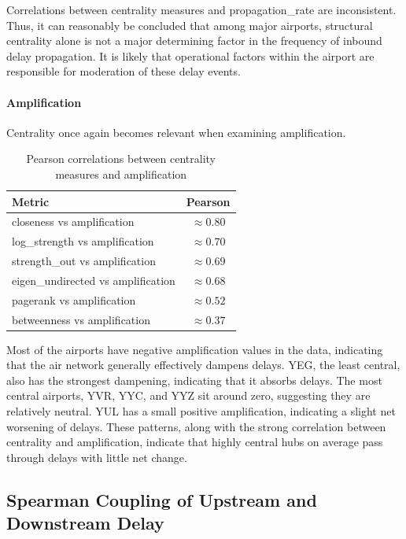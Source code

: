 \documentclass[10pt]{article}
\begin{document}
Correlations between centrality measures and propagation\_rate are inconsistent. Thus, it can reasonably be concluded that among major airports, structural centrality alone is not a major determining factor in the frequency of inbound delay propagation. It is likely that operational factors within the airport are responsible for moderation of these delay events.

\paragraph{Amplification}

Centrality once again becomes relevant when examining amplification.

\begin{table}[h!]
    \centering
    \caption{Pearson correlations between centrality measures and amplification}
    \begin{tabular}{l c}
        \toprule
        Metric & Pearson \\
        \midrule
        closeness vs amplification        & $\approx 0.80$ \\
        log\_strength vs amplification    & $\approx 0.70$ \\
        strength\_out vs amplification    & $\approx 0.69$ \\
        eigen\_undirected vs amplification& $\approx 0.68$ \\
        pagerank vs amplification         & $\approx 0.52$ \\
        betweenness vs amplification      & $\approx 0.37$ \\
        \bottomrule
    \end{tabular}
\end{table}

Most of the airports have negative amplification values in the data, indicating that the air network generally effectively dampens delays. YEG, the least central, also has the strongest dampening, indicating that it absorbs delays. The most central airports, YVR, YYC, and YYZ sit around zero, suggesting they are relatively neutral. YUL has a small positive amplification, indicating a slight net worsening of delays. These patterns, along with the strong correlation between centrality and amplification, indicate that highly central hubs on average pass through delays with little net change.

\subsection{Spearman Coupling of Upstream and Downstream Delay}
\end{document}
